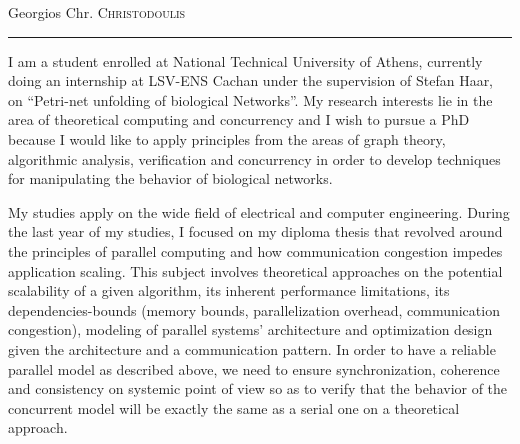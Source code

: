 \documentclass[a4paper,12pt]{article}
\begin{document}
\pagestyle{plain} %



\par{\centering
		{\Huge Georgios Chr. \textsc{Christodoulis}
	}\bigskip\par}
\hrule
\par{I am a student enrolled at National Technical University of Athens, currently doing an internship at LSV-ENS Cachan under the supervision of Stefan Haar, on “Petri-net unfolding of biological Networks”.  My research interests lie in the area of theoretical computing and concurrency and I wish to pursue a PhD because I would like to apply principles from the areas of graph theory, algorithmic analysis, verification and concurrency in order to develop techniques for manipulating the behavior of biological networks.}

\par{My studies apply on the wide field of electrical and computer engineering. During the last year of my studies, I focused on my diploma thesis that revolved around the principles of parallel computing and how communication congestion impedes application scaling. This subject involves theoretical approaches on the potential scalability of a given algorithm, its inherent performance limitations, its dependencies-bounds (memory bounds, parallelization overhead, communication congestion), modeling of parallel systems’ architecture and optimization design given the architecture and a communication pattern. In order to have a reliable parallel model as described above, we need to ensure synchronization, coherence and consistency on systemic point of view so as to verify that the behavior of the concurrent model will be exactly the same as a serial one on a theoretical approach.}
\end{document}
